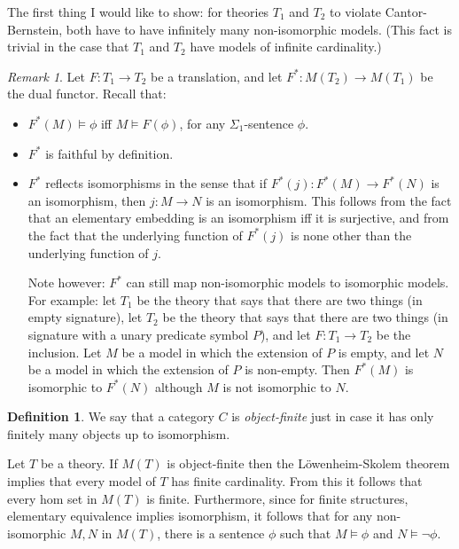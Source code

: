 \documentclass[12pt]{article}
\theoremstyle{definition}
\newtheorem*{defn}{Definition}
\theoremstyle{remark}
\newtheorem*{note}{Remark}
\newcommand{\3}{\mathcal}
\begin{document}
The first thing I would like to show: for theories $T_1$ and $T_2$ to
violate Cantor-Bernstein, both have to have infinitely many
non-isomorphic models. (This fact is trivial in the case that $T_1$
and $T_2$ have models of infinite cardinality.)

\begin{note} Let $F:T_1\to T_2$ be a translation, and let
  $F^*:M(T_2)\to M(T_1)$ be the dual functor. Recall that:
  \begin{itemize}
  \item $F^*(M)\vDash \phi$ iff $M\vDash F(\phi )$, for any
    $\Sigma _1$-sentence $\phi$.
    \item $F^*$ is faithful by definition.
    \item $F^*$ reflects isomorphisms in the sense that if
      $F^*(j):F^*(M)\to F^*(N)$ is an isomorphism, then $j:M\to N$ is
      an isomorphism. This follows from the fact that an elementary
      embedding is an isomorphism iff it is surjective, and from the
      fact that the underlying function of $F^*(j)$ is none other than
      the underlying function of $j$.

      Note however: $F^*$ can still map non-isomorphic models to
      isomorphic models. For example: let $T_1$ be the theory that
      says that there are two things (in empty signature), let $T_2$
      be the theory that says that there are two things (in signature
      with a unary predicate symbol $P$), and let $F:T_1\to T_2$ be
      the inclusion. Let $M$ be a model in which the extension of $P$
      is empty, and let $N$ be a model in which the extension of $P$
      is non-empty. Then $F^*(M)$ is isomorphic to $F^*(N)$ although
      $M$ is not isomorphic to $N$.
    \end{itemize} \end{note}

\begin{defn} We say that a category $C$ is \emph{object-finite} just
  in case it has only finitely many objects up to
  isomorphism. \end{defn}

Let $T$ be a theory. If $M(T)$ is object-finite then the
L{\"o}wenheim-Skolem theorem implies that every model of $T$ has
finite cardinality. From this it follows that every hom set in $M(T)$
is finite. Furthermore, since for finite structures, elementary
equivalence implies isomorphism, it follows that for any
non-isomorphic $M,N$ in $M(T)$, there is a sentence $\phi$ such that
$M\vDash\phi$ and $N\vDash\neg\phi$.
\end{document}
